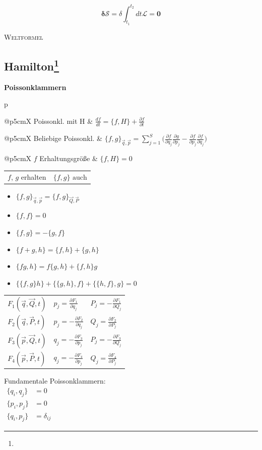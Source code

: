 \documentclass[12pt,a4paper, twoside]{article}
\makeatletter
\renewcommand{\d}[2]{\frac{d #1}{d #2}}
\newcommand{\pd}[2]{\frac{\partial #1}{\partial #2}}
\renewcommand{\=}[1]{\stackrel{#1}{=}}
\theoremstyle{definition}
\theoremstyle{remark}
\newcommand{\concept}[2]{%
\noindent
\begin{framed}
\noindent\textbf{#1}
\par\begin{tabular}{p{\linewidth}}
#2
\end{tabular}
\end{framed}
}
\newcommand{\f}[2]{%
\noindent\begin{tabularx}{\linewidth}{@{}p{5cm}X}
#1 & $#2$
\end{tabularx}}
\makeatother
\begin{document}
\begin{center}
\begin{framed}
\noindent
$$\mathbf{\delta \mathcal{S} =} \delta \int_{t_1}^{t_2} dt \mathscr{L}\mathbf{= 0}$$
\begin{center}\textsc{Weltformel}\end{center}
\end{framed}
\end{center}

\newpage
\subsection[Hamilton]{Hamilton\let\thefootnote\relax\footnote{}}

\concept{Poissonklammern}{

\f{Poissonkl. mit H}{\d{f}{t} = \{f, H\} + \pd{f}{t}}
\f{Beliebige Poissonkl.}{\{f, g\}_{\vec{q}, \vec{p}} = \sum_{j=1}^S \Big( \pd{f}{q_j} \pd{g}{p_j} - \pd{f}{p_j} \pd{f}{q_j}\Big)}
\f{$f$ Erhaltungsgröße}{\{f, H\} = 0}
\f{$f$, $g$ erhalten}{\{f, g\} \text{ auch}}


\begin{center}
\begin{framed}
\begin{itemize}
\itemsep-0.5em
\item $\{f,g\}_{\vec{q}, \vec{p}} = \{f,g\}_{\vec{Q}, \vec{P}}$
\item $\{f, f\} = 0$
\item $\{f,g\} = -\{g, f\}$
\item $\{f+g, h\} = \{f,h\} + \{g, h\}$
\item $\{fg, h\} = f\{g,h\} + \{f,h\}g$
\item $\{\{f,g\}h\} + \{\{g,h\}, f\} + \{\{h,f\}, g\} = 0$
\end{itemize}


\begin{tabular}{l|l|l}
$F_1(\vec{q}, \vec{Q}, t)$ & $p_j = \pd{F_1}{q_j}$ & $P_j = - \pd{F_1}{Q_j}$\\
$F_2(\vec{q}, \vec{P}, t)$ & $p_j = -\pd{F_2}{q_j}$ & $Q_j = \pd{F_2}{P_j}$\\
$F_3(\vec{p}, \vec{Q}, t)$ & $q_j = -\pd{F_3}{p_j}$ & $P_j = - \pd{F_3}{Q_j}$\\
$F_4(\vec{p}, \vec{P}, t)$ & $q_j = -\pd{F_4}{p_j}$ & $Q_j = \pd{F_4}{P_j}$\\
\end{tabular}
\end{framed}
\end{center}

\begin{center}
\begin{framed}
Fundamentale Poissonklammern:\\
$\begin{aligned}
\{q_i, q_j\} &= 0 \quad\\
\{p_i, p_j\} &= 0\\
\{q_i, p_j\} &= \delta_{ij}
\end{aligned}$\\
\end{framed}
\end{center}
}
\end{document}
